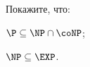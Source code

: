 Покажите, что:
\begin{enumcyr}
    \item $\P \subseteq \NP \cap \coNP$;
    \item $\NP \subseteq \EXP$.
\end{enumcyr}